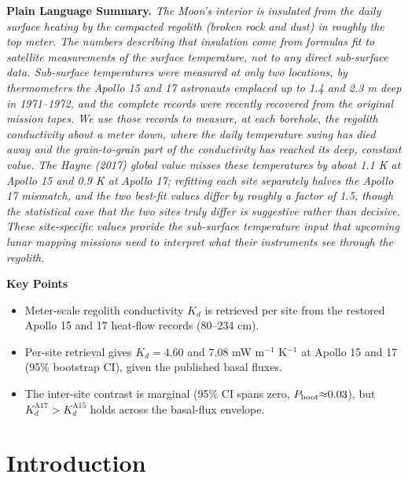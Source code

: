 \documentclass[11pt]{article}
\newenvironment{plainlanguagesummary}{%
  \par\medskip\noindent\textbf{Plain Language Summary.}\itshape\small}{\par\medskip}
\begin{document}
\begin{plainlanguagesummary}
The Moon's interior is insulated from the daily surface heating by the
compacted regolith (broken rock and dust) in roughly the top meter. The
numbers describing that insulation come from formulas fit to satellite
measurements of the surface temperature, not to any direct sub-surface
data. Sub-surface temperatures were measured at only two locations, by
thermometers the Apollo 15 and 17 astronauts emplaced up to 1.4 and
2.3 m deep in 1971--1972, and the complete records were recently
recovered from the original mission tapes. We use those records to
measure, at each borehole, the regolith conductivity about a meter down,
where the daily temperature swing has died away and the grain-to-grain
part of the conductivity has reached its deep, constant value. The
Hayne (2017) global value misses these temperatures by about 1.1 K at
Apollo 15 and 0.9 K at Apollo 17; refitting each site separately halves
the Apollo 17 mismatch, and the two best-fit values differ by roughly a
factor of 1.5, though the statistical case that the two sites truly
differ is suggestive rather than decisive. These site-specific values provide the
sub-surface temperature input that upcoming lunar mapping missions need
to interpret what their instruments see through the regolith.
\end{plainlanguagesummary}

\medskip
\noindent\textbf{Key Points}
\begin{itemize}\itemsep2pt
  \item Meter-scale regolith conductivity
        $K_d$ is retrieved per site from the restored Apollo 15 and 17
        heat-flow records (80--234 cm).
  \item Per-site retrieval gives $K_d=4.60$ and $7.08$
        mW m$^{-1}$ K$^{-1}$ at Apollo 15 and 17 (95\% bootstrap CI),
        given the published basal fluxes.
  \item The inter-site contrast is marginal (95\% CI spans zero,
        $P_{\rm boot}{\approx}0.03$), but
        $K_d^{\mathrm{A17}}{>}K_d^{\mathrm{A15}}$ holds across the
        basal-flux envelope.
\end{itemize}


\section{Introduction}\label{sec:intro}
\end{document}
